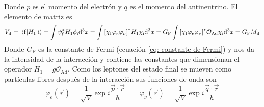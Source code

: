 Donde $p$ es el momento del electrón y $q$ es el momento del antineutrino. El elemento de matriz es $$V_\mathrm{if}=\mel{\mathrm{f}}{H_1}{\mathrm{i}}=\int \psi_\mathrm{f}^* H_1 \phi_\mathrm{i} \dd^3 x=\int \qty[\chi_\mathrm{f} \varphi_e \varphi_{\Bar{\nu}}]^* H_1 \chi_\mathrm{i} \dd^3 x=G_\mathrm{F} \int \qty[\chi_\mathrm{f} \varphi_e \varphi_{\Bar{\nu}}]^* \mathcal{O}_\mathrm{Ad} \chi_\mathrm{i} \dd^3 x =G_\mathrm{F} M_\mathrm{if}$$ 
Donde $G_\mathrm{F}$ es la constante de Fermi (ecuación \ref{eq: constante de Fermi}) y nos da la intensidad de la interacción y contiene las constantes que dimensionan el operador $H_1=g\mathcal{O}_\mathrm{Ad}$.
Como los leptones del estado final se mueven como partículas libres después de la interacción  sus funciones de onda son 
\begin{equation*}
        \varphi_e(\vec{r})=\frac{1}{\sqrt{V}} \exp{i\frac{\vec{p}\cdot \vec{r}}{\hbar}}\quad \quad \varphi_\nu(\vec{r})=\frac{1}{\sqrt{V}} \exp{i\frac{\vec{q}\cdot \vec{r}}{\hbar}}
\end{equation*}

